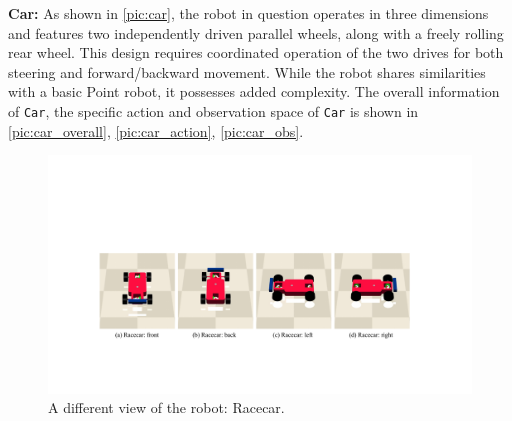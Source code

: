 \documentclass{article}
\begin{document}
\begin{table}[H]
\caption{The specific observation space of Car}
\label{pic:car_obs}
\end{table}

\textbf{Car:} As shown in \autoref{pic:car}, the robot in question operates in three dimensions and features two independently driven parallel wheels, along with a freely rolling rear wheel. This design requires coordinated operation of the two drives for both steering and forward/backward movement. While the robot shares similarities with a basic Point robot, it possesses added complexity. The overall information of \texttt{Car}, the specific action and observation space of \texttt{Car} is shown in \autoref{pic:car_overall}, \autoref{pic:car_action}, \autoref{pic:car_obs}.

\begin{figure}[H]
  \centering
  \includegraphics[width=0.6\linewidth]{assets/appendix/Racecar.pdf}
  \caption{A different view of the robot: Racecar.}
  \label{pic:racecar}
\end{figure}
\end{document}
